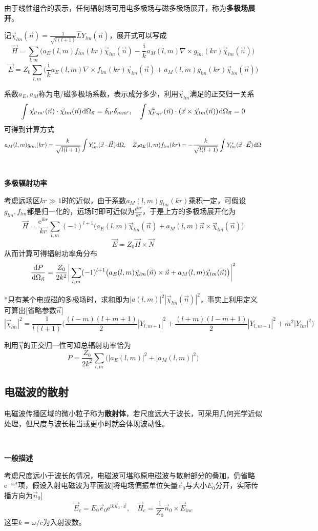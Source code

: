 \documentclass[a4paper,UTF8,fontset=windows]{ctexart}
\newcommand*{\dr}{\hspace{0.07em}\mathrm{d}}
\newcommand*{\er}{\mathrm{e}}
\newcommand*{\ir}{\mathrm{i}}
\newcommand*{\ve}{\vec{E}}
\newcommand*{\vh}{\vec{H}}
\newcommand*{\vn}{\vec{N}}
\newcommand*{\ves}{\vec{e}}
\newcommand*{\vns}{\vec{n}}
\newcommand*{\vx}{\vec{x}}
\newcommand*{\vchi}{\vec{\chi}}
\newcommand*{\dt}[2][t]{\frac{\dr #2}{\dr #1}}
\begin{document}
由于线性组合的表示，任何辐射场可用电多极场与磁多极场展开，称为\textbf{多极场展开}。

记$\vchi_{lm}(\vns)=\frac{1}{\sqrt{l(l+1)}}\hat{L}Y_{lm}(\vns)$，展开式可以写成
$$\vh=\sum_{l,m}\bigg(a_E(l,m)f_{lm}(kr)\vchi_{lm}(\vns)-\frac{\ir}{k}a_M(l,m)\nabla\times g_{lm}(kr)\vchi_{lm}(\vns)\bigg)$$
$$\ve=Z_0\sum_{l,m}\bigg(\frac{\ir}{k}a_E(l,m)\nabla\times f_{lm}(kr)\vchi_{lm}(\vns)+a_M(l,m)g_{lm}(kr)\vchi_{lm}(\vns)\bigg)$$

系数$a_E,a_M$称为电/磁多极场系数，表示成分多少，利用$\vchi_{lm}$满足的正交归一关系
$$\int\vchi_{l'm'}(\vns)\cdot\vchi_{lm}(\vns)\dr\Omega_{\vns}=\delta_{ll'}\delta_{mm'},\quad\int\vchi_{l'm'}^*(\vns)\cdot(\vx\times\vchi_{lm}(\vns))\dr\Omega_{\vns}=0$$
可得到计算方式
$$a_M(l,m)g_{lm}(kr)=\frac{k}{\sqrt{l(l+1)}}\int Y_{lm}^*(\vx\cdot\vh)\dr\Omega,\quad Z_0a_E(l,m)f_{lm}(kr)=-\frac{k}{\sqrt{l(l+1)}}\int Y_{lm}^*(\vx\cdot\ve)\dr\Omega$$

\

\textbf{多极辐射功率}

考虑远场区$kr\gg1$时的近似，由于系数$a_M(l,m)g_{lm}(kr)$乘积一定，可假设$g_{lm},f_{lm}$都是归一化的，远场时即可近似为$\frac{\er^{\ir kr}}{kr}$，于是上方的多极场展开化为
$$\vh=\frac{\er^{\ir kr}}{kr}\sum_{l,m}(-1)^{l+1}\big(a_E(l,m)\vchi_{lm}(\vns)+a_M(l,m)\vns\times\vchi_{lm}(\vns)\big)$$
$$\ve=Z_0\vh\times\vn$$
从而计算可得辐射功率角分布
$$\dt[\Omega_{\vns}]{P}=\frac{Z_0}{2k^2}\bigg|\sum_{l,m}(-1)^{l+1}\big(a_E(l,m)\vchi_{lm}(\vns)\times\vns+a_M(l,m)\vchi_{lm}(\vns)\big)\bigg|^2$$

*只有某个电或磁的多极场时，求和即为$|a(l,m)|^2|\vchi_{lm}(\vns)|^2$，事实上利用定义可算出[省略参数$\vns$]
$$|\vchi_{lm}|^2=\frac{1}{l(l+1)}\bigg(\frac{(l-m)(l+m+1)}{2}|Y_{l,m+1}|^2+\frac{(l+m)(l-m+1)}{2}|Y_{l,m-1}|^2+m^2|Y_{lm}|^2\bigg)$$

利用$\vchi$的正交归一性可知总辐射功率恰为
$$P=\frac{Z_0}{2k^2}\sum_{l,m}\big(|a_E(l,m)|^2+|a_M(l,m)|^2\big)$$

\subsection{电磁波的散射}

电磁波传播区域的微小粒子称为\textbf{散射体}，若尺度远大于波长，可采用几何光学近似处理，但尺度与波长相当或更小时就会体现波动性。

\

\textbf{一般描述}

考虑尺度远小于波长的情况，电磁波可堪称原电磁波与散射部分的叠加，仍省略$\er^{-\ir\omega t}$项，假设入射电磁波为平面波[将电场偏振单位矢量$\ves_0$与大小$E_0$分开，实际传播方向为$\vns_0$]
$$\ve_c=E_0\ves_0\er^{\ir k\vns_0\cdot\vx},\quad\vh_c=\frac{1}{Z_0}\vns_0\times\ve_{inc}$$
这里$k=\omega/c$为入射波数。
\end{document}
